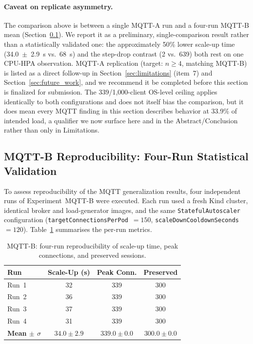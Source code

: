 \documentclass[3p,twocolumn]{elsarticle}
\theoremstyle{plain}%
\theoremstyle{definition}%
\begin{document}
\paragraph{Caveat on replicate asymmetry.} The comparison above is between a single MQTT-A run and a four-run MQTT-B mean (Section~\ref{sec:mqtt_b_multi}). We report it as a preliminary, single-comparison result rather than a statistically validated one: the approximately 50\% lower scale-up time (34.0~$\pm$~2.9~s vs.\ 68~s) and the step-drop contrast (2 vs.\ 639) both rest on one CPU-HPA observation. MQTT-A replication (target: $n \geq 4$, matching MQTT-B) is listed as a direct follow-up in Section~\ref{sec:limitations} (item~7) and Section~\ref{sec:future_work}, and we recommend it be completed before this section is finalized for submission. The 339/1{,}000-client OS-level ceiling applies identically to both configurations and does not itself bias the comparison, but it does mean every MQTT finding in this section describes behavior at 33.9\% of intended load, a qualifier we now surface here and in the Abstract/Conclusion rather than only in Limitations.

\subsection{MQTT-B Reproducibility: Four-Run Statistical Validation}
\label{sec:mqtt_b_multi}

To assess reproducibility of the MQTT generalization results, four independent runs of
Experiment~MQTT-B were executed. Each run used a fresh Kind cluster, identical broker and
load-generator images, and the same \texttt{StatefulAutoscaler} configuration
(\texttt{targetConnectionsPerPod}~$= 150$, \texttt{scaleDownCooldownSeconds}~$= 120$).
Table~\ref{tab:mqtt_b_multi} summarises the per-run metrics.

\begin{table}[!ht]
\centering
\caption{MQTT-B: four-run reproducibility of scale-up time, peak connections, and preserved sessions.}
\label{tab:mqtt_b_multi}
\small
\begin{tabular}{@{}lccc@{}}
\toprule
\rowcolor{gray!12}
\textbf{Run} & \textbf{Scale-Up (s)} & \textbf{Peak Conn.} & \textbf{Preserved} \\
\midrule
Run~1 & 32 & 339 & 300 \\
Run~2 & 36 & 339 & 300 \\
Run~3 & 37 & 339 & 300 \\
Run~4 & 31 & 339 & 300 \\
\midrule
\rowcolor{gray!6}
\textbf{Mean $\pm$ $\sigma$} & $34.0 \pm 2.9$ & $339.0 \pm 0.0$ & $300.0 \pm 0.0$ \\
\bottomrule
\end{tabular}
\end{table}
\end{document}
